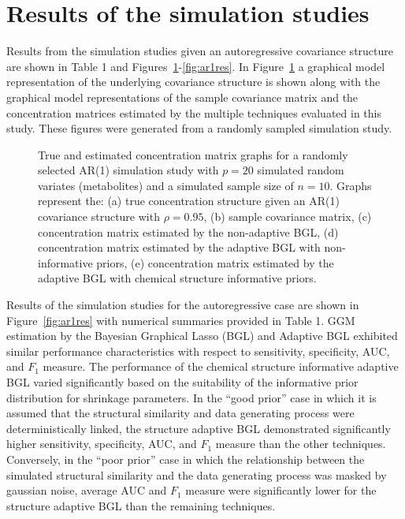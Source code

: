 \section{Results of the simulation studies}
Results from the simulation studies given an autoregressive covariance structure are shown in Table 1 and Figures~\ref{fig:ar1}-\ref{fig:ar1res}. In Figure~\ref{fig:ar1} a graphical model representation of the underlying covariance structure is shown along with the graphical model representations of the sample covariance matrix and the concentration matrices estimated by the multiple techniques evaluated in this study. These figures were generated from a randomly sampled simulation study. 

\begin{figure}[h!]
	\caption[AR(1) Simulation]{True and estimated concentration matrix graphs for a randomly selected AR(1) simulation study with $p=20$ simulated random variates (metabolites) and a simulated sample size of $n=10$. Graphs represent the: (a) true concentration structure given an AR(1) covariance structure with $\rho=0.95$, (b) sample covariance matrix, (c) concentration matrix estimated by the non-adaptive BGL, (d) concentration matrix estimated by the adaptive BGL with non-informative priors, (e) concentration matrix estimated by the adaptive BGL with chemical structure informative priors.  \label{fig:ar1} }
\end{figure}

Results of the simulation studies for the autoregressive case are shown in Figure~\ref{fig:ar1res} with numerical summaries provided in Table 1. GGM estimation by the Bayesian Graphical Lasso (BGL) and Adaptive BGL exhibited similar performance characteristics with respect to sensitivity, specificity, AUC, and $F_1$ measure. The performance of the chemical structure informative adaptive BGL varied significantly based on the suitability of the informative prior distribution for shrinkage parameters. In the “good prior” case in which it is assumed that the structural similarity and data generating process were deterministically linked, the structure adaptive BGL demonstrated significantly higher sensitivity, specificity, AUC, and $F_1$ measure than the other techniques. Conversely, in the “poor prior” case in which the relationship between the simulated structural similarity and the data generating process was masked by gaussian noise, average AUC and $F_1$ measure were significantly lower for the structure adaptive BGL than the remaining techniques. 

